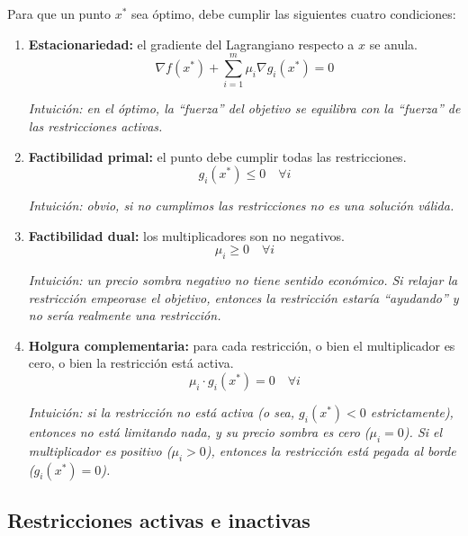 \documentclass[12pt]{article}
\begin{document}
Para que un punto $x^*$ sea óptimo, debe cumplir las siguientes cuatro condiciones:

\begin{enumerate}
    \item \textbf{Estacionariedad:} el gradiente del Lagrangiano respecto a $x$ se anula.
    \[
    \nabla f(x^*) + \sum_{i=1}^{m} \mu_i \nabla g_i(x^*) = 0
    \]

    \vspace{0.3em}

    \textit{Intuición: en el óptimo, la ``fuerza'' del objetivo se equilibra con la ``fuerza'' de las restricciones activas.}

    \item \textbf{Factibilidad primal:} el punto debe cumplir todas las restricciones.
    \[
    g_i(x^*) \leq 0 \quad \forall i
    \]

    \vspace{0.3em}

    \textit{Intuición: obvio, si no cumplimos las restricciones no es una solución válida.}

    \item \textbf{Factibilidad dual:} los multiplicadores son no negativos.
    \[
    \mu_i \geq 0 \quad \forall i
    \]

    \vspace{0.3em}

    \textit{Intuición: un precio sombra negativo no tiene sentido económico. Si relajar la restricción empeorase el objetivo, entonces la restricción estaría ``ayudando'' y no sería realmente una restricción.}

    \item \textbf{Holgura complementaria:} para cada restricción, o bien el multiplicador es cero, o bien la restricción está activa.
    \[
    \mu_i \cdot g_i(x^*) = 0 \quad \forall i
    \]

    \vspace{0.3em}

    \textit{Intuición: si la restricción no está activa (o sea, $g_i(x^*) < 0$ estrictamente), entonces no está limitando nada, y su precio sombra es cero ($\mu_i = 0$). Si el multiplicador es positivo ($\mu_i > 0$), entonces la restricción está pegada al borde ($g_i(x^*) = 0$).}
\end{enumerate}

\subsection{Restricciones activas e inactivas}
\end{document}
